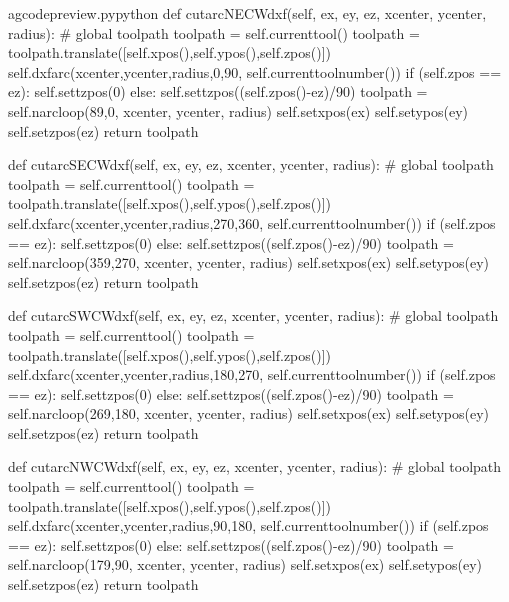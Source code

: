 \documentclass{ltxdoc}
\begin{document}
\begin{writecode}{a}{gcodepreview.py}{python}
    def cutarcNECWdxf(self, ex, ey, ez, xcenter, ycenter, radius):
#        global toolpath
        toolpath = self.currenttool()
        toolpath = toolpath.translate([self.xpos(),self.ypos(),self.zpos()])
        self.dxfarc(xcenter,ycenter,radius,0,90, self.currenttoolnumber())
        if (self.zpos == ez):
            self.settzpos(0)
        else:         
            self.settzpos((self.zpos()-ez)/90)
        toolpath = self.narcloop(89,0, xcenter, ycenter, radius)
        self.setxpos(ex)
        self.setypos(ey)
        self.setzpos(ez)
        return toolpath

    def cutarcSECWdxf(self, ex, ey, ez, xcenter, ycenter, radius):
#        global toolpath
        toolpath = self.currenttool()
        toolpath = toolpath.translate([self.xpos(),self.ypos(),self.zpos()])
        self.dxfarc(xcenter,ycenter,radius,270,360, self.currenttoolnumber())
        if (self.zpos == ez):
            self.settzpos(0)
        else:         
            self.settzpos((self.zpos()-ez)/90)
        toolpath = self.narcloop(359,270, xcenter, ycenter, radius)
        self.setxpos(ex)
        self.setypos(ey)
        self.setzpos(ez)
        return toolpath

    def cutarcSWCWdxf(self, ex, ey, ez, xcenter, ycenter, radius):
#        global toolpath
        toolpath = self.currenttool()
        toolpath = toolpath.translate([self.xpos(),self.ypos(),self.zpos()])
        self.dxfarc(xcenter,ycenter,radius,180,270, self.currenttoolnumber())
        if (self.zpos == ez):
            self.settzpos(0)
        else:         
            self.settzpos((self.zpos()-ez)/90)
        toolpath = self.narcloop(269,180, xcenter, ycenter, radius)
        self.setxpos(ex)
        self.setypos(ey)
        self.setzpos(ez)
        return toolpath

    def cutarcNWCWdxf(self, ex, ey, ez, xcenter, ycenter, radius):
#        global toolpath
        toolpath = self.currenttool()
        toolpath = toolpath.translate([self.xpos(),self.ypos(),self.zpos()])
        self.dxfarc(xcenter,ycenter,radius,90,180, self.currenttoolnumber())
        if (self.zpos == ez):
            self.settzpos(0)
        else:         
            self.settzpos((self.zpos()-ez)/90)
        toolpath = self.narcloop(179,90, xcenter, ycenter, radius)
        self.setxpos(ex)
        self.setypos(ey)
        self.setzpos(ez)
        return toolpath

\end{writecode}
\addtocounter{gcpy}{120}
\end{document}
